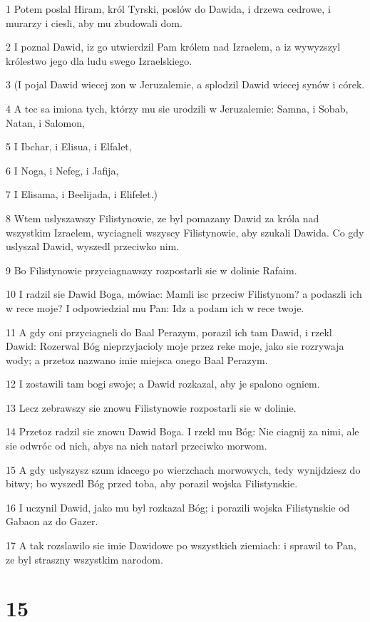 \par 1 Potem poslal Hiram, król Tyrski, poslów do Dawida, i drzewa cedrowe, i murarzy i ciesli, aby mu zbudowali dom.
\par 2 I poznal Dawid, iz go utwierdzil Pam królem nad Izraelem, a iz wywyzszyl królestwo jego dla ludu swego Izraelskiego.
\par 3 (I pojal Dawid wiecej zon w Jeruzalemie, a splodzil Dawid wiecej synów i córek.
\par 4 A tec sa imiona tych, którzy mu sie urodzili w Jeruzalemie: Samna, i Sobab, Natan, i Salomon,
\par 5 I Ibchar, i Elisua, i Elfalet,
\par 6 I Noga, i Nefeg, i Jafija,
\par 7 I Elisama, i Beelijada, i Elifelet.)
\par 8 Wtem uslyszawszy Filistynowie, ze byl pomazany Dawid za króla nad wszystkim Izraelem, wyciagneli wszyscy Filistynowie, aby szukali Dawida. Co gdy uslyszal Dawid, wyszedl przeciwko nim.
\par 9 Bo Filistynowie przyciagnawszy rozpostarli sie w dolinie Rafaim.
\par 10 I radzil sie Dawid Boga, mówiac: Mamli isc przeciw Filistynom? a podaszli ich w rece moje? I odpowiedzial mu Pan: Idz a podam ich w rece twoje.
\par 11 A gdy oni przyciagneli do Baal Perazym, porazil ich tam Dawid, i rzekl Dawid: Rozerwal Bóg nieprzyjacioly moje przez reke moje, jako sie rozrywaja wody; a przetoz nazwano imie miejsca onego Baal Perazym.
\par 12 I zostawili tam bogi swoje; a Dawid rozkazal, aby je spalono ogniem.
\par 13 Lecz zebrawszy sie znowu Filistynowie rozpostarli sie w dolinie.
\par 14 Przetoz radzil sie znowu Dawid Boga. I rzekl mu Bóg: Nie ciagnij za nimi, ale sie odwróc od nich, abys na nich natarl przeciwko morwom.
\par 15 A gdy uslyszysz szum idacego po wierzchach morwowych, tedy wynijdziesz do bitwy; bo wyszedl Bóg przed toba, aby porazil wojska Filistynskie.
\par 16 I uczynil Dawid, jako mu byl rozkazal Bóg; i porazili wojska Filistynskie od Gabaon az do Gazer.
\par 17 A tak rozslawilo sie imie Dawidowe po wszystkich ziemiach: i sprawil to Pan, ze byl straszny wszystkim narodom.

\chapter{15}

